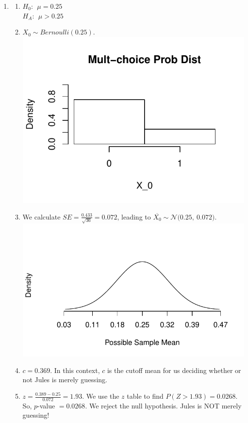 \documentclass[12pt,letterpaper]{article}
\newcommand{\N}[2]{\mathcal{N}\big(#1,~#2\big)}
\begin{document}
\begin{multicols}{2}
\begin{enumerate}
\item \begin{enumerate}
\item $H_0:~~ \mu=0.25 $ \\
$H_A:~~ \mu>0.25 $
\item $X_0 \sim Bernoulli(0.25)$. 
\\ \includegraphics[scale=0.7]{code/mult_choice}
\item We calculate $SE=\frac{0.433}{\sqrt{36}} = 0.072$, leading to $\overline{X_0} \sim \N{0.25}{0.072}$.
\\ \includegraphics[scale=0.6]{code/mult_samp_hist}
\item $c=0.369$. In this context, $c$ is the cutoff mean for us deciding whether or not Jules is merely guessing.
\item $z = \frac{0.389-0.25}{0.072} = 1.93$. We use the $z$ table to find $P(Z > 1.93) = 0.0268$. So, $p$-value $=0.0268$. We reject the null hypothesis. Jules is NOT merely guessing!
\end{enumerate}


\end{enumerate}
\end{multicols}
\end{document}
